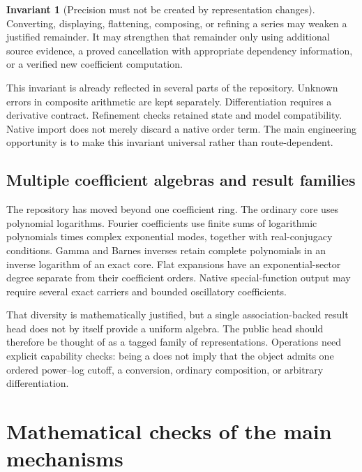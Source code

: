 \documentclass[11pt,a4paper]{article}
\newcommand{\code}[1]{\texttt{\detokenize{#1}}}
\theoremstyle{definition}
\newtheorem{invariant}{Invariant}
\begin{document}
\begin{invariant}[Precision must not be created by representation changes]
Converting, displaying, flattening, composing, or refining a series may weaken a justified remainder. It may strengthen that remainder only using additional source evidence, a proved cancellation with appropriate dependency information, or a verified new coefficient computation.
\end{invariant}

This invariant is already reflected in several parts of the repository. Unknown errors in composite arithmetic are kept separately. Differentiation requires a derivative contract. Refinement checks retained state and model compatibility. Native import does not merely discard a native order term. The main engineering opportunity is to make this invariant universal rather than route-dependent.\cite{operations,refinement,native,envelopes}

\subsection{Multiple coefficient algebras and result families}

The repository has moved beyond one coefficient ring. The ordinary core uses polynomial logarithms. Fourier coefficients use finite sums of logarithmic polynomials times complex exponential modes, together with real-conjugacy conditions. Gamma and Barnes inverses retain complete polynomials in an inverse logarithm of an exact core. Flat expansions have an exponential-sector degree separate from their coefficient orders. Native special-function output may require several exact carriers and bounded oscillatory coefficients.\cite{fourier,gammainverse,barnesinverse,flat,native}

That diversity is mathematically justified, but a single association-backed result head does not by itself provide a uniform algebra. The public head should therefore be thought of as a tagged family of representations. Operations need explicit capability checks: being a \code{GeneralizedSeries} does not imply that the object admits one ordered power--log cutoff, a \code{SeriesData} conversion, ordinary composition, or arbitrary differentiation.

\section{Mathematical checks of the main mechanisms}
\label{sec:mathematics}
\end{document}
